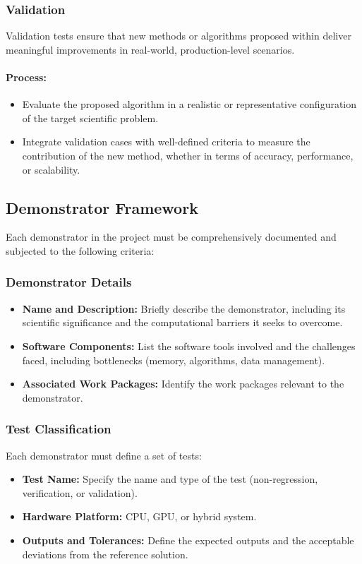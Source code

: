 \subsubsection{Validation}
\label{sec:validation}

Validation tests ensure that new methods or algorithms proposed within \exama deliver meaningful improvements in real-world, production-level scenarios.

\paragraph{Process:}
\begin{itemize}
    \item Evaluate the proposed algorithm in a realistic or representative configuration of the target scientific problem.
    \item Integrate validation cases with well-defined criteria to measure the contribution of the new method, whether in terms of accuracy, performance, or scalability.
\end{itemize}

\subsection{Demonstrator Framework}
\label{sec:demonstrators}

Each demonstrator in the \exama project must be comprehensively documented and subjected to the following criteria:

\subsubsection{Demonstrator Details}
\begin{itemize}
    \item \textbf{Name and Description:} Briefly describe the demonstrator, including its scientific significance and the computational barriers it seeks to overcome.
    \item \textbf{Software Components:} List the software tools involved and the challenges faced, including bottlenecks (memory, algorithms, data management).
    \item \textbf{Associated Work Packages:} Identify the work packages relevant to the demonstrator.
\end{itemize}

\subsubsection{Test Classification}
Each demonstrator must define a set of tests:
\begin{itemize}
    \item \textbf{Test Name:} Specify the name and type of the test (non-regression, verification, or validation).
    \item \textbf{Hardware Platform:} CPU, GPU, or hybrid system.
    \item \textbf{Outputs and Tolerances:} Define the expected outputs and the acceptable deviations from the reference solution.
\end{itemize}

